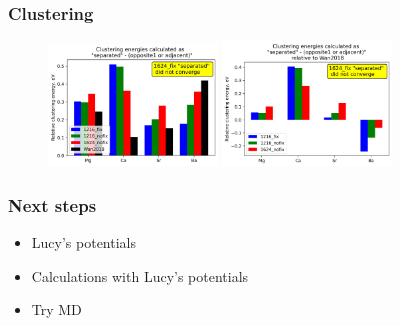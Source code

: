 \documentclass{beamer}
\begin{document}
\begin{frame}
\frametitle{Clustering}

\begin{figure}
\includegraphics[width=0.4\textwidth]{clustering.jpg}
\includegraphics[width=0.4\textwidth]{clustering_relative.jpg}
\end{figure}

\end{frame}

\begin{frame}
\frametitle{Next steps}

\begin{itemize}
  \item Lucy's potentials
  \item Calculations with Lucy's potentials
  \item Try MD
\end{itemize}

\end{frame}
\end{document}

